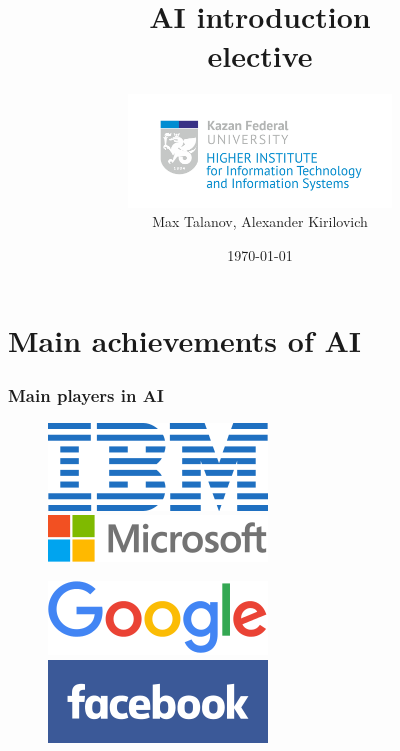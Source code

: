 \documentclass[12pt, aspectratio=169]{beamer}
\title[AI intro]{AI introduction \\elective} %
\author[Max Talanov, Alexander Kirilovich]{
  \includegraphics[height=3cm]{ITIS_logo_bright}\\
  Max Talanov, Alexander Kirilovich
}
\institute[ITIS: KFU] %
{
Machine cognition lab, Intellectual robotics department, ITIS \\ %
\medskip
\textit{max.talanov@gmail.com} %
}
\date{\today} %
\begin{document}
\begin{frame}
\titlepage %
\end{frame}



\section{Main achievements of AI} %
\begin{frame}
\frametitle{Main players in AI}
\begin{figure}
  \includegraphics[width=0.45\linewidth]{220px-IBM.png}
  \includegraphics[width=0.45\linewidth]{220px-Microsoft.png}
\end{figure}
\begin{figure}
  \includegraphics[width=0.45\linewidth]{220px-Google.png}
  \includegraphics[width=0.45\linewidth]{220px-Facebook.png}
\end{figure}
\end{frame}
\end{document}
